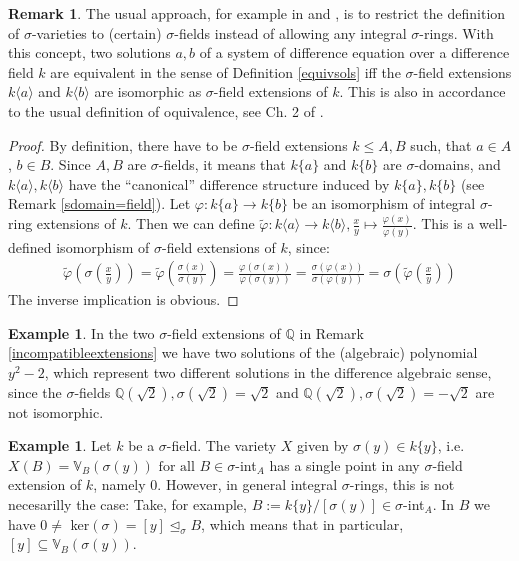 \documentclass{article}
\def\Q{\mathbb{Q}}
\def\VV{\mathbb{V}}
\def\s{\sigma}
\def\si{\unlhd_{\sigma}}
\def\fa{\text{ for all }}
\newenvironment{bew}{\begin{proof}[Proof]}{\end{proof}}
\theoremstyle{definition}
\newtheorem{ex}[Satz]{Example}
\newtheorem{rem}[Satz]{Remark}
\begin{document}
\begin{rem}
The usual approach, for example in \cite{cohn} and \cite{levin}, is to restrict the definition of $\s$-varieties to (certain) $\s$-fields instead of allowing any integral $\s$-rings. With this concept,
two solutions $a,b$ of a system of difference equation over a difference field $k$ are equivalent in the sense of Definition \ref{equivsols} iff the $\s$-field extensions $k\langle a \rangle$ and $k\langle b \rangle$ are isomorphic as $\s$-field extensions of $k$.
This is also in accordance to the usual definition of oquivalence, see Ch. 2 of \cite{wibmer}.
\begin{bew}
By definition, there have to be $\s$-field extensions $k \leq A,B$ such, that $a \in A$, $b \in B$. Since $A,B$ are $\s$-fields, it means that $k\{a\}$ and $k\{b\}$ are $\s$-domains, 
and $k\langle a \rangle, k\langle b \rangle$ have the ``canonical'' difference structure induced by $k\{a\}, k\{b\}$ (see Remark \ref{sdomain=field}). Let $\varphi: k\{a\} \rightarrow k\{b\}$ be an isomorphism of integral $\s$-ring extensions of $k$.
Then we can define $\tilde \varphi: k \langle a \rangle \rightarrow k\langle b \rangle, \frac{x}{y} \mapsto \frac{\varphi(x)}{\varphi{(y)}}$. This is a well-defined isomorphism of $\s$-field extensions of $k$, since:
\begin{align*}
\tilde \varphi (\s (\frac{x}{y})) = \tilde \varphi( \frac{\s(x)}{\s(y)}) = \frac{ \varphi (\s (x))}{ \varphi (\s(y))} =  \frac{\s (\varphi (x))}{\s (\varphi(y))} = \s( \tilde \varphi (\frac{x}{y}))
\end{align*}
The inverse implication is obvious.
\end{bew}
\end{rem}

\begin{ex}
In the two $\s$-field extensions of $\Q$ in Remark \ref{incompatibleextensions} we have two solutions of the (algebraic) polynomial $y^2-2$, which represent two different solutions in the difference algebraic sense,
since the $\s$-fields $\Q(\sqrt{2}), \s(\sqrt{2}) = \sqrt{2}$ and $\Q(\sqrt{2}), \s(\sqrt{2}) = -\sqrt{2}$ are not isomorphic. 
\end{ex}

\begin{ex}
Let $k$ be a $\s$-field. The variety $X$ given by $\s(y) \in k\{y\}$, i.e. $X(B) = \VV_B(\s(y)) \fa B \in \s$-int$_A$ has a single point in any $\s$-field extension of $k$, namely $0$. However, in general integral $\s$-rings,
this is not necesarilly the case: Take, for example, $B:= k\{y\}/[\s(y)] \in \s$-int$_A$. In $B$ we have $0 \neq $ ker$(\s) = [y] \si B$, which means that in particular, $[y] \subseteq \VV_B(\s(y))$.
\end{ex}
\end{document}
